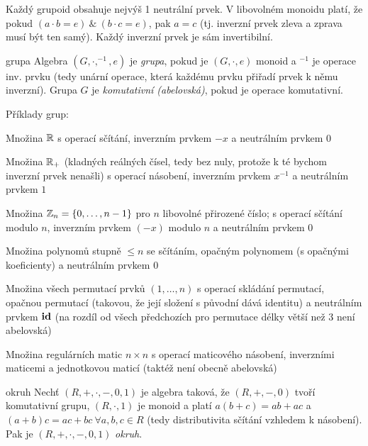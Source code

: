 \begin{poznamka}
Každý grupoid obsahuje nejvýš 1 neutrální prvek. V libovolném monoidu platí, že pokud $(a\cdot b = e)\ \&\ (b\cdot c = e)$, pak $a = c$ (tj. inverzní prvek zleva a zprava musí být ten samý). Každý inverzní prvek je sám invertibilní.
\end{poznamka}

\begin{definiceN}{grupa}
Algebra $(G,\cdot,^{-1},e)$ je \emph{grupa}, pokud je $(G,\cdot,e)$ monoid a $^{-1}$ je operace inv. prvku (tedy unární operace, která každému prvku přiřadí prvek k němu inverzní).
Grupa $G$ je \emph{komutativní (abelovská)}, pokud je operace \uv{$\cdot$} komutativní.
\end{definiceN}

\begin{priklady}
Příklady grup:
\begin{pitemize}
    \item Množina $\mathbb{R}$ s operací sčítání, inverzním prvkem $-x$ a neutrálním prvkem $0$
    \item Množina $\mathbb{R}_{+}$ (kladných reálných čísel, tedy bez nuly, protože k té bychom inverzní prvek nenašli) s operací násobení, inverzním prvkem $x^{-1}$ a neutrálním prvkem $1$
    \item Množina $\mathbb{Z}_n=\{0,\dots,n-1\}$ pro $n$ libovolné přirozené číslo; s operací sčítání modulo $n$, inverzním prvkem $(-x)$ modulo $n$ a neutrálním prvkem $0$
    \item Množina polynomů stupně $\leq n$ se sčítáním, opačným polynomem (s opačnými koeficienty) a neutrálním prvkem $0$
    \item Množina všech permutací prvků $(1,\dots,n)$ s operací skládání permutací, opačnou permutací (takovou, že její složení s původní dává identitu) a neutrálním prvkem $\mathbf{id}$ (na rozdíl od všech předchozích pro permutace délky větší než 3 není abelovská)
    \item Množina regulárních matic $n\times n$ s operací maticového násobení, inverzními maticemi a jednotkovou maticí (taktéž není obecně abelovská)
\end{pitemize}
\end{priklady}


\begin{definiceN}{okruh}
Nechť $(R,+,\cdot,-,0,1)$ je algebra taková, že $(R,+,-,0)$ tvoří komutativní grupu, $(R,\cdot,1)$ je monoid a platí $a(b+c)=ab+ac$ a $(a+b)c=ac+bc\ \forall a,b,c\in R$ (tedy distributivita sčítání vzhledem k násobení). Pak je $(R,+,\cdot,-,0,1)$ \emph{okruh}.
\end{definiceN}

